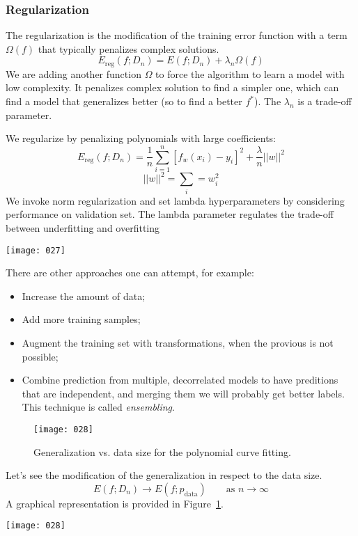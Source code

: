 \subsubsection{Regularization}
The regularization is the modification of the training error function with a term \(\Omega(f)\) that typically penalizes complex solutions.
\[E_{\text{reg}}(f;D_n) = E(f;D_n) + \lambda_n \Omega (f)\]
We are adding another function \(\Omega\) to force the algorithm to learn a model with low complexity. It penalizes complex solution to find a simpler one, which can find a model that generalizes better (so to find a better \(f^*\)). The \(\lambda_n\) is a trade-off parameter.

\begin{example}
We regularize by penalizing polynomials with large coefficients:
\[E_{\text{reg}}(f;D_n) = \frac 1 n \sum_{i=1}^n [f_w(x_i)-y_i]^2 + \frac \lambda n ||w||^2\]
\[||w||^2 = \sum_i=w_i^2\]
We invoke norm regularization and set lambda hyperparameters by considering performance on validation set. The lambda parameter regulates the trade-off between underfitting and overfitting

\begin{center}
    \texttt{[image: 027]}
    \label{fig:027}
\end{center}

\end{example}

There are other approaches one can attempt, for example:
\begin{itemize}
    \item
    Increase the amount of data;
    \item
    Add more training samples;
    \item
    Augment the training set with transformations, when the provious is not possible;
    \item
    Combine prediction from multiple, decorrelated models to have preditions that are independent, and merging them we will probably get better labels. This technique is called \emph{ensembling}.
\end{itemize}

\begin{figure}[t!]
    \begin{center}
        \texttt{[image: 028]}
        \caption{Generalization vs. data size for the polynomial curve fitting.}
        \label{fig:028}
    \end{center}
\end{figure}
\begin{example}
Let's see the modification of the generalization in respect to the data size.
\[E(f;D_n) \to E(f;p_{\text{data}}) \qquad \text{as } n \to \infty\]
A graphical representation is provided in Figure~\ref{fig:028}.

\begin{center}
    \texttt{[image: 028]}
    \label{fig:028}
\end{center}
\end{example}

